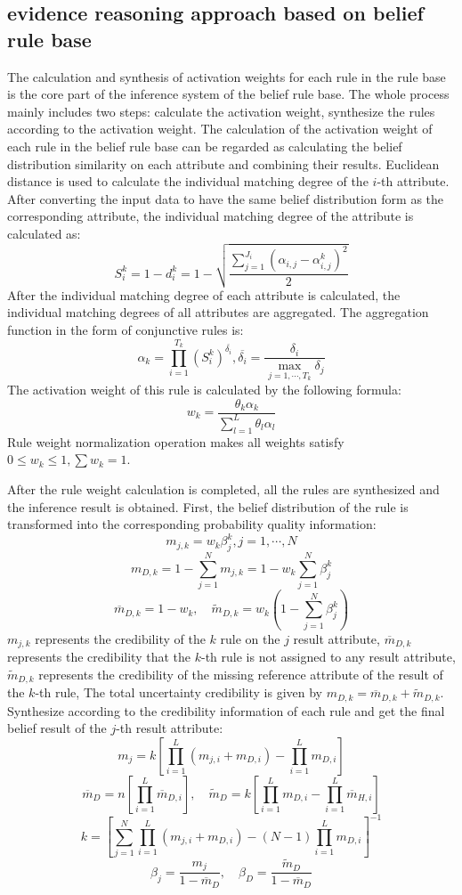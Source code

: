 \documentclass{ieeeaccess}
\begin{document}
\subsection{evidence reasoning approach based on belief rule base}
The calculation and synthesis of activation weights for each rule in the rule base is the core part of the inference system of the belief rule base.
The whole process mainly includes two steps: calculate the activation weight, synthesize the rules according to the activation weight.
The calculation of the activation weight of each rule in the belief rule base can be regarded as calculating the belief distribution similarity on each attribute and combining their results.
Euclidean distance is used to calculate the individual matching degree of the $i$-th attribute. After converting the input data to have the same belief distribution form as the corresponding attribute,
the individual matching degree of the attribute is calculated as:
$$S_i^k=1-d_i^k=1-\sqrt{\frac{\sum_{j=1}^{J_i}(\alpha_{i,j}-\alpha_{i,j}^k)^2}{2}}$$
After the individual matching degree of each attribute is calculated, the individual matching degrees of all attributes are aggregated. The aggregation function in the form of conjunctive rules is:
$$\alpha_k=\prod_{i=1}^{T_k}(S_i^k)^{\overline{\delta_i}},\overline{\delta_i}=\frac{\delta_i}{\max_{j=1,\cdots,T_k}\delta_j}$$
The activation weight of this rule is calculated by the following formula:
$$w_k=\frac{\theta_k\alpha_k}{\sum_{l=1}^L\theta_l\alpha_l}$$
Rule weight normalization operation makes all weights satisfy $0\leq w_k\leq 1,\sum w_k=1$.

After the rule weight calculation is completed, all the rules are synthesized and the inference result is obtained.
First, the belief distribution of the rule is transformed into the corresponding probability quality information:
$$m_{j,k}=w_k\beta_j^k,j=1,\cdots,N$$
$$m_{D,k}=1-\sum_{j=1}^Nm_{j,k}=1-w_k\sum_{j=1}^{N}\beta_j^k$$
$$\overline{m}_{D,k}=1-w_k,\quad\widetilde{m}_{D,k}=w_k(1-\sum_{j=1}^N\beta_j^k)$$
$m_{j,k}$ represents the credibility of the $k$ rule on the $j$ result attribute,
$\overline{m}_{D,k}$ represents the credibility that the $k$-th rule is not assigned to any result attribute,
$\widetilde{m}_{D,k}$  represents the credibility of the missing reference attribute of the result of the $k$-th rule,
The total uncertainty credibility is given by $m_{D,k}=\overline{m}_{D,k}+\widetilde{m}_{D,k}$.
Synthesize according to the credibility information of each rule and get the final belief result of the $j$-th result attribute:
$$m_j=k[\prod_{i=1}^L(m_{j,i}+m_{D,i})-\prod_{i=1}^Lm_{D,i}]$$
$$\overline{m}_D=n[\prod_{i=1}^L\overline{m}_{D,i}],\quad\widetilde{m}_D=k[\prod_{i=1}^Lm_{D,i}-\prod_{i=1}^L\overline{m}_{H,i}]$$
$$k=[\sum_{j=1}^N\prod_{i=1}^L(m_{j,i}+m_{D,i})-(N-1)\prod_{i=1}^Lm_{D,i}]^{-1}$$
$$\beta_j=\frac{m_j}{1-\overline{m}_D},\quad\beta_D=\frac{\widetilde{m}_D}{1-\overline{m}_D}$$
\end{document}
